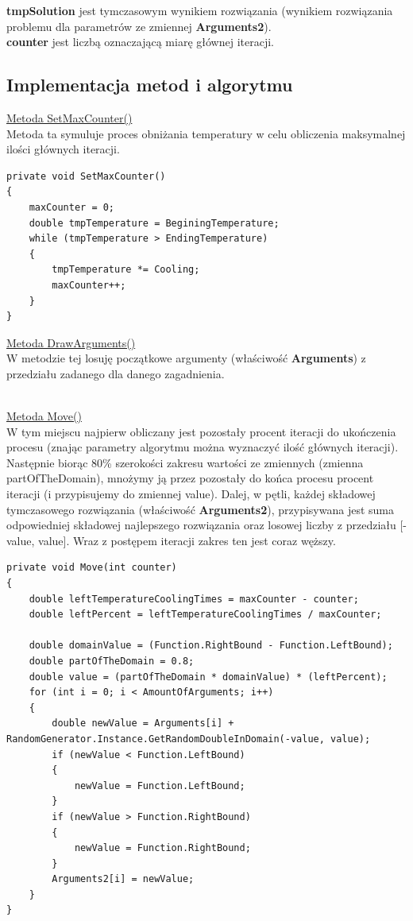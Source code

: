 \documentclass[twoside]{projektInzynierskiMS1}
\newcommand{\si}{ś}
\begin{document}
\textbf{tmpSolution} jest tymczasowym wynikiem rozwiązania (wynikiem rozwiązania problemu dla parametrów ze zmiennej \textbf{Arguments2}). \\

\textbf{counter} jest liczbą oznaczającą miarę głównej iteracji. \\

\subsection{Implementacja metod i algorytmu}

\underline{Metoda SetMaxCounter()} \\
Metoda ta symuluje proces obniżania temperatury w celu obliczenia maksymalnej ilo\si ci głównych iteracji. \\
\begin{verbatim}
private void SetMaxCounter()
{
    maxCounter = 0;
    double tmpTemperature = BeginingTemperature;
    while (tmpTemperature > EndingTemperature)
    {
        tmpTemperature *= Cooling;
        maxCounter++;
    }
}
\end{verbatim}

\underline{Metoda DrawArguments()} \\
W metodzie tej losuję początkowe argumenty (wła\si ciwo\si ć \textbf{Arguments}) z przedziału zadanego dla danego zagadnienia. \\\


%

\underline{Metoda Move()} \\
W tym miejscu najpierw obliczany jest pozostały procent iteracji do ukończenia procesu (znając parametry algorytmu można wyznaczyć ilo\si ć głównych iteracji). Następnie biorąc 80\% szeroko\si ci zakresu warto\si ci ze zmiennych (zmienna partOfTheDomain), mnożymy ją przez pozostały do końca procesu procent iteracji (i przypisujemy do zmiennej value). Dalej, w pętli, każdej składowej tymczasowego rozwiązania (wła\si ciwo\si ć \textbf{Arguments2}), przypisywana jest suma odpowiedniej składowej najlepszego rozwiązania oraz losowej liczby z przedziału [-value, value]. Wraz z postępem iteracji zakres ten jest coraz węższy. \\
\begin{verbatim}
private void Move(int counter)
{
    double leftTemperatureCoolingTimes = maxCounter - counter;
    double leftPercent = leftTemperatureCoolingTimes / maxCounter;

    double domainValue = (Function.RightBound - Function.LeftBound);
    double partOfTheDomain = 0.8;
    double value = (partOfTheDomain * domainValue) * (leftPercent);
    for (int i = 0; i < AmountOfArguments; i++)
    {
        double newValue = Arguments[i] + 
RandomGenerator.Instance.GetRandomDoubleInDomain(-value, value);
        if (newValue < Function.LeftBound)
        {
            newValue = Function.LeftBound;
        }
        if (newValue > Function.RightBound)
        {
            newValue = Function.RightBound;
        }
        Arguments2[i] = newValue;
    }
}
\end{verbatim}
\end{document}

